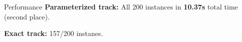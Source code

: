 \documentclass[final]{beamer}
\newlength{\sepwidth}
\newlength{\colwidth}
\newcommand{\separatorcolumn}{\begin{column}{\sepwidth}\end{column}}
\theoremstyle{remark}
\begin{document}
\begin{frame}[t]
\begin{columns}[t]
\begin{column}{\colwidth}
      \begin{block}{Performance}
        \textbf{Parameterized track:} All 200 instances in \textbf{10.37s} total
        time (second place).

        \textbf{Exact track:} 157/200 instanes.

      \end{block}


    \end{column}
    \separatorcolumn
  \end{columns}
\end{frame}
\end{document}
